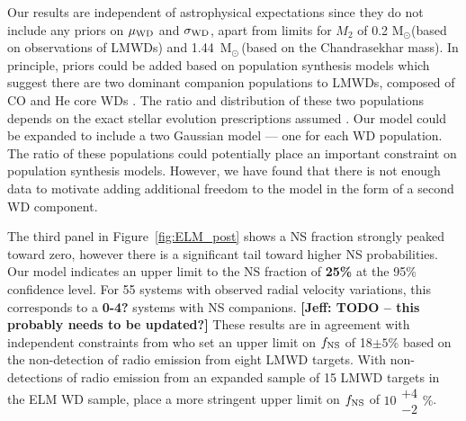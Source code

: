 \documentclass[apjl]{emulateapj}
\newcommand{\Msun}{\ifmmode {{\rm M}_{\odot}}\else M$_{\odot}$\fi}
\newcommand{\mf}{m_f}
\newcommand{\wdupper}{1.44}
\begin{document}
Our results are independent of astrophysical expectations since they do not include any priors on $\mu_{\rm WD}$ and $\sigma_{\rm WD}$, apart from limits for $M_2$ of 0.2 \Msun (based on observations of LMWDs) and \wdupper~\Msun\,(based on the Chandrasekhar mass). In principle, priors could be added based on population synthesis models which suggest there are two dominant companion populations to LMWDs, composed of CO and He core WDs \citep{han98}. The ratio and distribution of these two populations depends on the exact stellar evolution prescriptions assumed \citep[see discussion in, e.g., ][]{toonen12}. Our model could be expanded to include a two Gaussian model --- one for each WD population. The ratio of these populations could potentially place an important constraint on population synthesis models. However, we have found that there is not enough data to motivate adding additional freedom to the model in the form of a second WD component.


The third panel in Figure~\ref{fig:ELM_post} shows a NS fraction strongly peaked toward zero, however there is a significant tail toward higher NS probabilities. Our model indicates an upper limit to the NS fraction of {\bf 25\%} at the 95\% confidence level. For 55 systems with observed radial velocity variations, this corresponds to a {\bf 0-4?} systems with NS companions. {\bf [Jeff: TODO -- this probably needs to be updated?]} These results are in agreement with independent constraints from \citet{vLeeuwen07} who set an upper limit on $f_{\rm NS}$ of 18$\pm5$\% based on the non-detection of radio emission from eight LMWD targets. With non-detections of radio emission from an expanded sample of 15 LMWD targets in the ELM WD sample, \citet{agueros09b} place a more stringent upper limit on $f_{\rm NS}$ of $10\substack{+4 \\ -2}\%$. 


\end{document}
